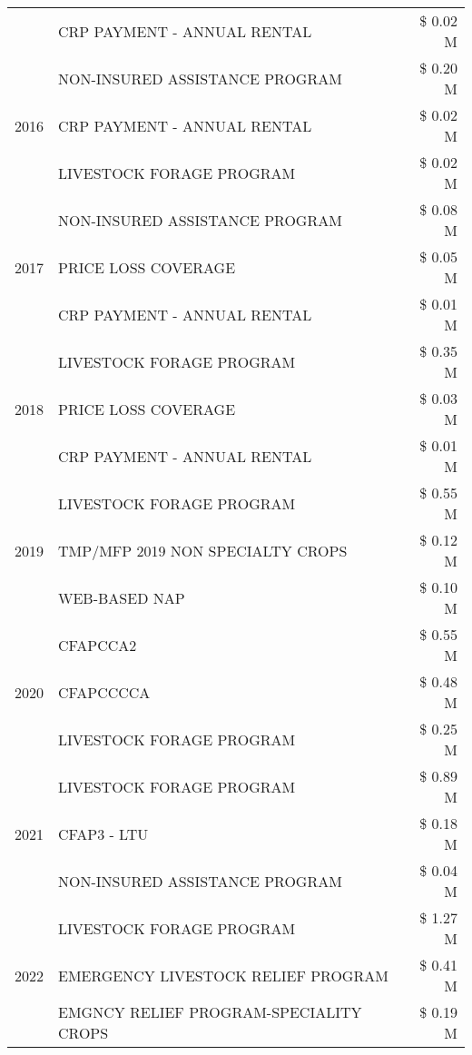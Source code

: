 \begin{tabular}{llr}
 & CRP PAYMENT - ANNUAL RENTAL & \$ 0.02 M \\
\cline{1-3}
\multirow[t]{3}{*}{2016} & NON-INSURED ASSISTANCE PROGRAM & \$ 0.20 M \\
 & CRP PAYMENT - ANNUAL RENTAL & \$ 0.02 M \\
 & LIVESTOCK FORAGE PROGRAM & \$ 0.02 M \\
\cline{1-3}
\multirow[t]{3}{*}{2017} & NON-INSURED ASSISTANCE PROGRAM & \$ 0.08 M \\
 & PRICE LOSS COVERAGE & \$ 0.05 M \\
 & CRP PAYMENT - ANNUAL RENTAL & \$ 0.01 M \\
\cline{1-3}
\multirow[t]{3}{*}{2018} & LIVESTOCK FORAGE PROGRAM & \$ 0.35 M \\
 & PRICE LOSS COVERAGE & \$ 0.03 M \\
 & CRP PAYMENT - ANNUAL RENTAL & \$ 0.01 M \\
\cline{1-3}
\multirow[t]{3}{*}{2019} & LIVESTOCK FORAGE PROGRAM & \$ 0.55 M \\
 & TMP/MFP 2019 NON SPECIALTY CROPS & \$ 0.12 M \\
 & WEB-BASED NAP & \$ 0.10 M \\
\cline{1-3}
\multirow[t]{3}{*}{2020} & CFAPCCA2 & \$ 0.55 M \\
 & CFAPCCCCA & \$ 0.48 M \\
 & LIVESTOCK FORAGE PROGRAM & \$ 0.25 M \\
\cline{1-3}
\multirow[t]{3}{*}{2021} & LIVESTOCK FORAGE PROGRAM & \$ 0.89 M \\
 & CFAP3 - LTU & \$ 0.18 M \\
 & NON-INSURED ASSISTANCE PROGRAM & \$ 0.04 M \\
\cline{1-3}
\multirow[t]{3}{*}{2022} & LIVESTOCK FORAGE PROGRAM & \$ 1.27 M \\
 & EMERGENCY LIVESTOCK RELIEF PROGRAM & \$ 0.41 M \\
 & EMGNCY RELIEF PROGRAM-SPECIALITY CROPS & \$ 0.19 M \\
\cline{1-3}
\bottomrule
\end{tabular}
